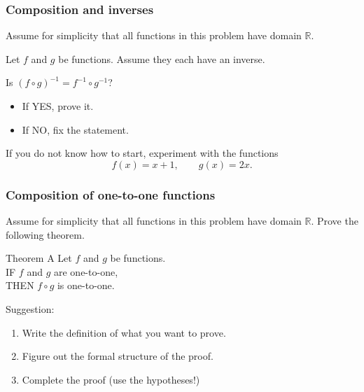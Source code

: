 \documentclass[14pt]{beamer}
\begin{document}
\begin{frame}[t]
	\frametitle{Composition and inverses}

	Assume for simplicity that all functions in this problem have domain
	$\mathbb{R}$.

	\vfill

	Let $f$ and $g$ be functions. Assume they each have an inverse.

	\vfill

	Is $\displaystyle \left( f \circ g \right)^{-1}= f^{-1}\circ g^{-1}$?

	\begin{itemize}
		\item If YES, prove it.

		\item If NO, fix the statement.
	\end{itemize}

	\vfill

	If you do not know how to start, experiment with the functions
	\[
		f(x) = x + 1, \quad \quad g(x) = 2x.
	\]
\end{frame}

\begin{frame}[t]
	\frametitle{Composition of one-to-one functions}

	Assume for simplicity that all functions in this problem have domain
	$\mathbb{R}$. Prove the following theorem.

	\vfill

	\begin{block}{Theorem A}
		Let $f$ and $g$ be functions. \\ IF $f$ and $g$ are one-to-one, \\ THEN $f \circ
		g$ is one-to-one.
	\end{block}

	\vfill

	Suggestion:
	\begin{enumerate}
		\item Write the definition of what you want to prove.

		\item Figure out the formal structure of the proof.

		\item Complete the proof (use the hypotheses!)
	\end{enumerate}
\end{frame}
\end{document}
